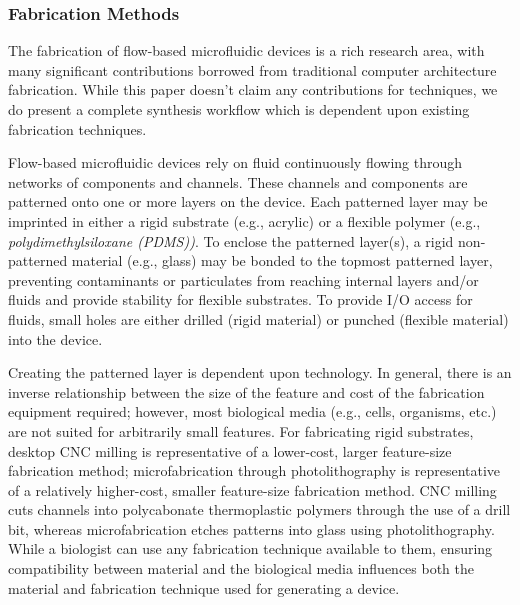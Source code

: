 \subsubsection{Fabrication Methods}
\label{sec:fabrication_methods}

The fabrication of flow-based microfluidic devices is a rich research area, with many significant contributions borrowed from traditional computer architecture fabrication.
While this paper doesn't claim any contributions for techniques, we do present 
a complete synthesis workflow which is dependent upon existing fabrication techniques.

Flow-based microfluidic devices rely on fluid continuously flowing through networks of components and channels.
These channels and components are patterned onto one or more layers on the device.
Each patterned layer may be imprinted in either a rigid substrate (e.g., acrylic) \cite{el2006cells,hung2005continuous,pamme2007continuous} or a flexible polymer (e.g., \textit{polydimethylsiloxane (PDMS))}\cite{xia1998soft}.
To enclose the patterned layer(s), a rigid non-patterned material (e.g., glass) may be bonded to the topmost patterned layer, preventing contaminants or particulates from reaching internal layers and/or fluids and provide stability for flexible substrates.
To provide I/O access for fluids, small holes are either drilled (rigid material) or punched (flexible material) into the device.

Creating the patterned layer is dependent upon technology.
In general, there is an inverse relationship between the size of the feature and cost of the fabrication equipment required; however, most biological media (e.g., cells, organisms, etc.) are not suited for arbitrarily small features.
For fabricating rigid substrates, desktop CNC milling\cite{lashkaripour2019performance,lashkaripour2018desktop} is representative of a lower-cost, larger feature-size fabrication method; microfabrication through photolithography is representative of a relatively higher-cost, smaller feature-size fabrication method.
CNC milling cuts channels into polycabonate thermoplastic polymers through the use of a drill bit, whereas microfabrication etches patterns into glass using photolithography.
While a biologist can use any fabrication technique available to them, ensuring compatibility between material and the biological media influences both the material and fabrication technique used for generating a device.

